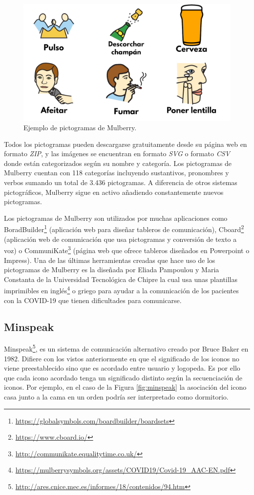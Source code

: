 \begin{figure}[h!]
	\centering
	\includegraphics[scale=0.2]{Imagenes/Bitmap/Mulberry}
	\caption{Ejemplo de pictogramas de Mulberry.}
	\label{fig:mulberry}
\end{figure}

Todos los pictogramas pueden descargarse gratuitamente desde su página web en formato \textit{ZIP}, y las imágenes se encuentran en formato \textit{SVG} o formato \textit{CSV} donde están categorizados según su nombre y categoría. 
Los pictogramas de Mulberry cuentan con 118 categorías incluyendo sustantivos, pronombres y verbos sumando un total de 3.436 pictogramas. A diferencia de otros sistemas pictográficos, Mulberry sigue en activo añadiendo constantemente nuevos pictogramas. 

Los pictogramas de Mulberry son utilizados por muchas aplicaciones como BoradBuilder\footnote{\url{ https://globalsymbols.com/boardbuilder/boardsets}} (aplicación web para diseñar tableros de comunicación), Cboard\footnote{\url{https://www.cboard.io/}} (aplicación web de comunicación que usa pictogramas y conversión de texto a voz) o CommuniKate\footnote{\url{http://communikate.equalitytime.co.uk/}} (página web que ofrece tableros diseñados en Powerpoint o Impress). Una de las últimas herramientas creadas que hace uso de los pictogramas de Mulberry es la diseñada por Eliada Pampoulou y Maria Constanta de la Universidad Tecnológica de Chipre la cual usa unas plantillas imprimibles en inglés\footnote{\url{https://mulberrysymbols.org/assets/COVID19/Covid-19_AAC-EN.pdf}} o griego para ayudar a la comunicación de los pacientes con la COVID-19 que tienen dificultades para comunicarse.






\subsection{Minspeak}
\label{cap3:sec:minspeak}
Minspeak\footnote{\url{http://ares.cnice.mec.es/informes/18/contenidos/94.htm}}, es un sistema de comunicación alternativo creado por Bruce Baker en 1982. Difiere con los vistos anteriormente en que el significado de los iconos no viene preestablecido sino que es acordado entre usuario y logopeda. Es por ello que cada icono acordado tenga un significado distinto según la secuenciación de iconos. Por ejemplo, en el caso de la Figura \ref{fig:minspeak} la asociación del icono casa junto a la cama en un orden podría ser interpretado como dormitorio. 

